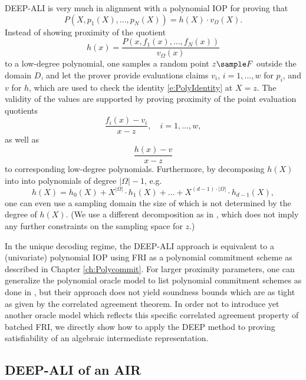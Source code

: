 \documentclass[11pt]{article}
\theoremstyle{definition}
\theoremstyle{remark}
\begin{document}
DEEP-ALI is very much in alignment with a polynomial IOP for proving that
\begin{equation}
\label{e:PolyIdentity}
P(X,p_1(X),..., p_N(X)) = h(X)\cdot v_\Omega(X). 
\end{equation}
Instead of showing proximity of the quotient
\[
h(x) = \frac{P(x,f_1(x),..., f_N(x))}{v_\Omega(x)}
\]
to a low-degree polynomial, one samples a random point $z\sample F$ outside the domain $D$, and let the prover provide evaluations claims $v_i$, $i=1,\ldots,w$ for $p_i$, and $v$ for $h$, which are used to check the identity \eqref{e:PolyIdentity} at $X=z$.
The validity of the values are supported by proving proximity of the point evaluation quotients
\[
\frac{f_i(x)-v_i}{x-z}, \quad i=1,\ldots ,w,
\]
as well as
\[
\frac{h(x)-v}{x-z}
\]
to corresponding low-degree polynomials.
Furthermore, by decomposing $h(X)$ into into polynomials of degree $|\Omega|-1$, e.g.
\begin{equation}
\label{e:SegmentPolys}
h(X)=h_0(X)+X^{|\Omega|}\cdot h_1(X)+ \ldots +X^{(d-1)\cdot |\Omega|}\cdot  h_{d-1}(X),
\end{equation}
one can even use a sampling domain the size of which is not determined by the degree of $h(X)$. 
(We use a different decomposition as in \cite{DEEPFRI, ethSTARK}, which does not imply any further constraints on the sampling space for $z$.)

In the unique decoding regime, the DEEP-ALI approach is equivalent to a (univariate) polynomial IOP using FRI as a polynomial commitment scheme as described in Chapter \ref{ch:Polycommit}. 
For larger proximity parameters, one can generalize the polynomial oracle model to list polynomial commitment schemes as done in \cite{Redshift}, but their approach does not yield soundness bounds which are as tight as given by the correlated agreement theorem. 
In order not to introduce yet another oracle model which reflects this specific correlated agreement property of batched FRI, we directly show how to apply the DEEP method to proving satisfiability of an algebraic intermediate representation.


\subsection{DEEP-ALI of an AIR}
\end{document}
